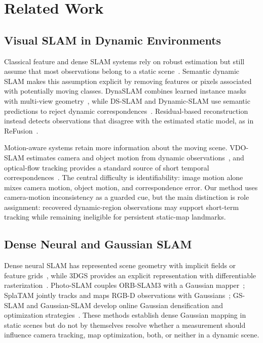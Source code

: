 \section{Related Work}

\subsection{Visual SLAM in Dynamic Environments}

Classical feature and dense SLAM systems rely on robust estimation but still assume that most observations belong to a static scene~\cite{mur2015orb,campos2021orbslam3,whelan2016elasticfusion,tan2013robustslam}.
Semantic dynamic SLAM makes this assumption explicit by removing features or pixels associated with potentially moving classes.
DynaSLAM combines learned instance masks with multi-view geometry~\cite{bescos2018dynaslam}, while DS-SLAM and Dynamic-SLAM use semantic predictions to reject dynamic correspondences~\cite{yu2018ds,xiao2019dynamic}.
Residual-based reconstruction instead detects observations that disagree with the estimated static model, as in ReFusion~\cite{palazzolo2019bonn}.

Motion-aware systems retain more information about the moving scene.
VDO-SLAM estimates camera and object motion from dynamic observations~\cite{zhang2020vdo}, and optical-flow tracking provides a standard source of short temporal correspondences~\cite{lucas1981optical}.
The central difficulty is identifiability: image motion alone mixes camera motion, object motion, and correspondence error.
Our method uses camera-motion inconsistency as a guarded cue, but the main distinction is role assignment: recovered dynamic-region observations may support short-term tracking while remaining ineligible for persistent static-map landmarks.

\subsection{Dense Neural and Gaussian SLAM}

Dense neural SLAM has represented scene geometry with implicit fields or feature grids~\cite{sucar2021imap,zhu2022nice,yang2022vox}, while 3DGS provides an explicit representation with differentiable rasterization~\cite{kerbl20233dgaussian}.
Photo-SLAM couples ORB-SLAM3 with a Gaussian mapper~\cite{huai2024photoSLAM}; SplaTAM jointly tracks and maps RGB-D observations with Gaussians~\cite{keetha2024splatam}; GS-SLAM and Gaussian-SLAM develop online Gaussian densification and optimization strategies~\cite{yan2023gs,yugay2023gaussianslam}.
These methods establish dense Gaussian mapping in static scenes but do not by themselves resolve whether a measurement should influence camera tracking, map optimization, both, or neither in a dynamic scene.

